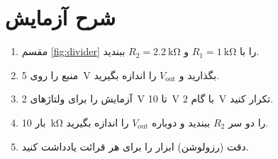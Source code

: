 \section{شرح آزمایش}

\begin{enumerate}
  \item مقسم \cref{fig:divider} را با $R_1=\qty{1}{\kilo\ohm}$ و $R_2=\qty{2.2}{\kilo\ohm}$ ببندید.
  \item منبع را روی \qty{5}{\volt} بگذارید و $V_\mathrm{out}$ را اندازه بگیرید.
  \item آزمایش را برای ولتاژهای \qty{2}{\volt} تا \qty{10}{\volt} با گام \qty{2}{\volt} تکرار کنید.
  \item بار \qty{10}{\kilo\ohm} را دو سر $R_2$ ببندید و دوباره $V_\mathrm{out}$ را اندازه بگیرید.
  \item دقت (رزولوشن) ابزار را برای هر قرائت یادداشت کنید.
\end{enumerate}
